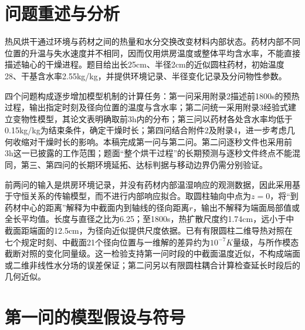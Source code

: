 \section{问题重述与分析}
热风烘干通过环境与药材之间的热量和水分交换改变材料内部状态。药材内部不同位置的升温与失水速度并不相同，因而仅用烘房温度或整体平均含水率，不能直接描述轴心的干燥进程。题目给出长25\unit{cm}、半径2\unit{cm}的近似圆柱药材，初始温度28\celsius、干基含水率2.55\unit{kg/kg}，并提供环境记录、半径变化记录及分问物性参数\cite{problem}。

四个问题构成逐步增加模型机制的计算任务：第一问采用附录2描述前1800\unit{s}的预热过程，输出指定时刻及径向位置的温度与含水率；第二问统一采用附录3经验式建立变物性模型，其论文表明确取前3\unit{h}内的分布；第三问以药材各处含水率均低于0.15\unit{kg/kg}为结束条件，确定干燥时长；第四问结合附件2及附录4，进一步考虑几何收缩对干燥时长的影响。本稿完成第一问与第二问。第二问逐秒文件也采用前3\unit{h}这一已披露的工作范围；题面“整个烘干过程”的长期预测与逐秒文件终点不能混同，第三、第四问的长期环境延拓、达标判据与移动边界仍需分别验证。

前两问的输入是烘房环境记录，并没有药材内部温湿响应的观测数据，因此采用基于守恒关系的传输模型，而不进行内部响应拟合。取圆柱轴向中点为$z=0$，将“到药材中心的距离”解释为中截面内到轴线的径向距离$r$，输出不解释为端面局部值或全长平均值。长度与直径之比为6.25；至1800\unit{s}，热扩散尺度约1.74\unit{cm}，远小于中截面距端面的12.5\unit{cm}，为径向近似提供尺度依据。已有有限圆柱二维导热对照在七个规定时刻、中截面21个径向位置与一维解的差异约为$10^{-7}\unit{K}$量级，与所作模态截断对照的变化同量级。这一检验支持第一问时段的中截面温度近似，不构成端面或二维非线性水分场的误差保证；第二问另以有限圆柱耦合计算检查延长时段后的几何近似。

\section{第一问的模型假设与符号}
